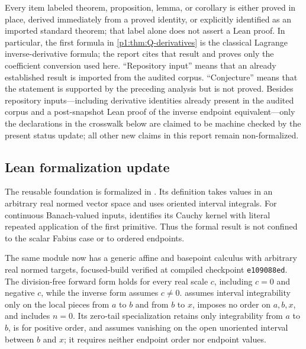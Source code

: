 \documentclass[11pt,oneside]{article}
\theoremstyle{definition}
\theoremstyle{remark}
\newcommand{\1}{\mathbf 1}
\begin{document}
\begin{statusbox}
Every item labeled theorem, proposition, lemma, or corollary is either proved
in place, derived immediately from a proved identity, or explicitly identified
as an imported standard theorem; that label alone does not assert a Lean
proof.  In particular, the first formula in \cref{p1:thm:Q-derivatives} is the
classical Lagrange inverse-derivative formula; the report cites that result and
proves only the coefficient conversion used here.  ``Repository input'' means
that an already established result is imported from the audited corpus.
``Conjecture'' means that the statement is supported by the preceding analysis
but is not proved.  Besides repository inputs---including derivative identities
already present in the audited corpus and a post-snapshot Lean proof of the
inverse endpoint equivalent---only the declarations in the crosswalk below are
claimed to be machine checked by the present status update; all other new
claims in this report remain non-formalized.
\end{statusbox}

\subsection{Lean formalization update}
The reusable foundation is formalized in
.  Its definition
 takes values in an arbitrary real normed vector
space and uses oriented interval integrals.  For continuous Banach-valued
inputs,
 identifies its Cauchy
kernel with literal repeated application of the first primitive.  Thus the
formal result is not confined to the scalar Fabius case or to ordered
endpoints.

The same module now has a generic affine and basepoint calculus with arbitrary
real normed targets, focused-build verified at compiled checkpoint
\texttt{e109088ed}.  The division-free forward form
 holds for every real scale \(c\), including
\(c=0\) and negative \(c\), while the inverse form
 assumes \(c\ne0\).
 assumes interval integrability
only on the local pieces from \(a\) to \(b\) and from \(b\) to \(x\), imposes
no order on \(a,b,x\), and includes \(n=0\).  Its zero-tail specialization
 retains only integrability
from \(a\) to \(b\), is for positive order, and assumes vanishing on
the open unoriented interval between \(b\) and \(x\); it requires neither
endpoint order nor endpoint values.
\end{document}

